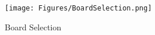 \begin{figure}[H]
    \centering
    \texttt{[image: Figures/BoardSelection.png]}
    \caption{Board Selection}
    \label{fig:mcu selection}
\end{figure}



